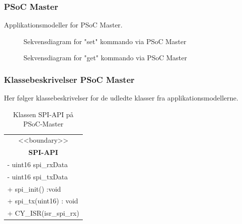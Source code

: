 \subsubsection{PSoC Master}

Applikationsmodeller for PSoC Master.

\begin{figure}[H] \centering
    \caption{Sekvensdiagram for "set" kommando via PSoC Master}
    \label{fig:sekvensdiagram_psoc_master_set}
\end{figure}

\begin{figure}[H] \centering
    \caption{Sekvensdiagram for "get" kommando via PSoC Master}
    \label{fig:sekvensdiagram_psoc_master_get}
\end{figure}

\subsubsection{Klassebeskrivelser PSoC Master}

Her følger klassebeskrivelser for de udledte klasser fra applikationsmodellerne.

\begin{table}[H]
    \centering
    \begin{tabular}{|l|}
    \hline
    \multicolumn{1}{|c|}{<<boundary>>} \\
    \multicolumn{1}{|c|}{\textbf{SPI-API}} \\
    \hline
    - uint16 spi\_rxData \\
    - uint16 spi\_txData \\
    \hline
    + spi\_init() :void \\
    + spi\_tx(uint16) : void \\
    + CY\_ISR(isr\_spi\_rx) \\
    \hline
    \end{tabular}
    \caption{Klassen SPI-API på PSoC-Master}
    \label{tab:classSpiApiPSoCMaster}
\end{table}


